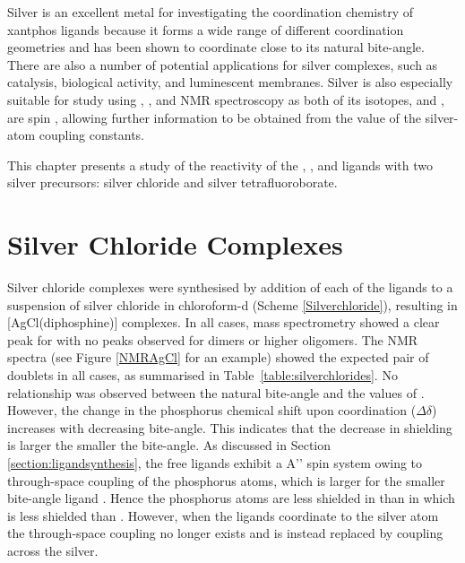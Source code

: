
Silver is an excellent metal for investigating the coordination chemistry of xantphos ligands because 
it forms a wide range of different coordination geometries and has been shown to coordinate \Phxantphos{} close to its natural bite-angle.\cite{Kaltzoglou2007}  There are also a number of potential applications for silver complexes, such as catalysis, biological activity, and luminescent membranes.  Silver is also especially suitable for study using \proton{}, \carbon{}, and \phosphorus{} NMR spectroscopy as both of its isotopes, \Agseven{} and \Agnine{}, are spin , allowing further information to be obtained from the value of the silver-atom coupling constants.  

This chapter presents a study of the reactivity of the \tBusixantphos, \tButhixantphos, and \tBuxantphos{} ligands with two silver precursors: silver chloride and silver tetrafluoroborate.

\section{Silver Chloride Complexes}
\label{section:AgCl}

Silver chloride complexes were synthesised by addition of each of the \tBuxantphos{} ligands to a suspension of silver chloride in chloroform-d (Scheme \ref{Silverchloride}), resulting in [AgCl(diphosphine)] complexes.  In all cases, mass spectrometry showed a clear peak for \ce{[M-Cl]+} with no peaks observed for dimers or higher oligomers.  The \phosphorus{} NMR spectra (see Figure \ref{NMRAgCl} for an example) showed the expected pair of doublets in all cases, as summarised in Table~\ref{table:silverchlorides}.  No relationship was observed between the natural bite-angle and the values of \JAgP.  However, the change in the phosphorus chemical shift upon coordination ($\Delta\delta$) increases with decreasing bite-angle.  This indicates that the decrease in shielding is larger the smaller the bite-angle.  As discussed in Section \ref{section:ligandsynthesis}, the free \tBuxantphos{} ligands exhibit a  A'' spin system owing to through-space coupling of the phosphorus atoms, which is larger for the smaller bite-angle ligand \tBusixantphos{}.  Hence the phosphorus atoms are less shielded in \tBusixantphos{} than in \tButhixantphos{} which is less shielded than \tBuxantphos.  However, when the ligands coordinate to the silver atom the through-space coupling no longer exists and is instead replaced by coupling across the silver.  

